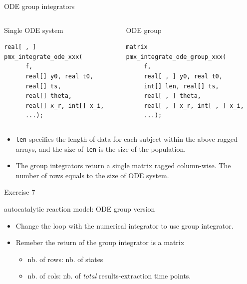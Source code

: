 \documentclass[presentation, allowframebreaks]{beamer}
\begin{document}
\begin{frame}[fragile,label={sec:org0107c40}]{ODE group integrators}
 \begin{columns}
\begin{column}{0.45\columnwidth}
\begin{block}{Single ODE system}
\begin{verbatim}
real[ , ]
pmx_integrate_ode_xxx(
      f,
      real[] y0, real t0,
      real[] ts,
      real[] theta,
      real[] x_r, int[] x_i,
      ...);
\end{verbatim}
\end{block}
\end{column}

\begin{column}{0.55\columnwidth}
\begin{block}{ODE group}
\begin{verbatim}
matrix
pmx_integrate_ode_group_xxx(
     f,
     real[ , ] y0, real t0,
     int[] len, real[] ts,
     real[ , ] theta,
     real[ , ] x_r, int[ , ] x_i,
     ...);
\end{verbatim}
\end{block}
\end{column}
\end{columns}
\begin{block}{}
\begin{itemize}
\item \texttt{len} specifies the length of data for each subject within
the above ragged arrays, and the size of \texttt{len} is the size
of the population.
\item The group integrators return a single matrix ragged
column-wise. The number of rows equals to the size of ODE system.
\end{itemize}
\end{block}
\end{frame}

\begin{frame}[label={sec:org71e1a23}]{Exercise 7}
\begin{block}{autocatalytic reaction model: ODE group version}
\begin{itemize}
\item Change the loop with the numerical integrator to use group
integrator.
\item Remeber the return of the group integrator is a matrix
\begin{itemize}
\item nb. of rows: nb. of states
\item nb. of cols: nb. of \emph{total} results-extraction time points.
\end{itemize}
\end{itemize}
\end{block}
\end{frame}
\end{document}
